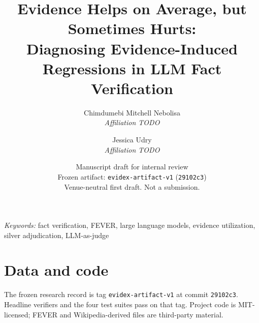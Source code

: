 \documentclass[11pt]{article}
\title{Evidence Helps on Average, but Sometimes Hurts:\\
Diagnosing Evidence-Induced Regressions in LLM Fact Verification}
\author{
Chimdumebi Mitchell Nebolisa\\
\textit{Affiliation TODO}\\
\and
Jessica Udry\\
\textit{Affiliation TODO}
}
\date{Manuscript draft for internal review\\[0.4em]
\small Frozen artifact: \texttt{evidex-artifact-v1} (\texttt{29102c3})\\
Venue-neutral first draft. Not a submission.}
\begin{document}
\maketitle

\begin{abstract}

\end{abstract}

\noindent\textit{Keywords:} fact verification, FEVER, large language models, evidence utilization, silver adjudication, LLM-as-judge















\section*{Data and code}
The frozen research record is tag \texttt{evidex-artifact-v1} at commit \texttt{29102c3}.
Headline verifiers and the four test suites pass on that tag.
Project code is MIT-licensed; FEVER and Wikipedia-derived files are third-party material.




\end{document}
